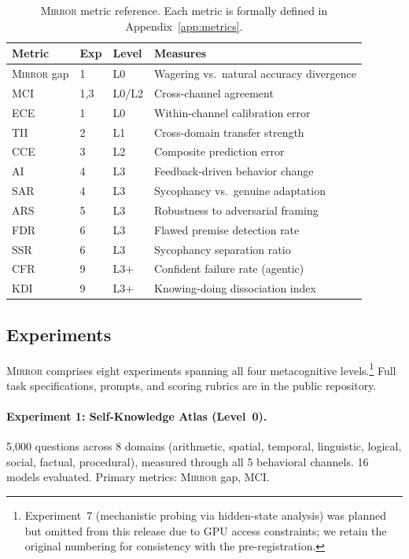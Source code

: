 \documentclass[10pt]{article}
\newcommand{\mirror}{\textsc{Mirror}}
\newcommand{\MCI}{MCI}
\newcommand{\CCE}{CCE}
\newcommand{\ARS}{ARS}
\newcommand{\KDI}{KDI}
\newcommand{\CFR}{CFR}
\newcommand{\SSR}{SSR}
\newcommand{\FDR}{FDR}
\newcommand{\TII}{TII}
\newcommand{\SAR}{SAR}
\newcommand{\AI}{AI}
\begin{document}
\begin{table}[h]
\centering
\caption{\mirror{} metric reference. Each metric is formally defined in Appendix~\ref{app:metrics}.}
\label{tab:metrics}
\small
\begin{tabular}{llll}
\toprule
Metric & Exp & Level & Measures \\
\midrule
\mirror{} gap & 1 & L0 & Wagering vs.\ natural accuracy divergence \\
\MCI{} & 1,3 & L0/L2 & Cross-channel agreement \\
ECE & 1 & L0 & Within-channel calibration error \\
\TII{} & 2 & L1 & Cross-domain transfer strength \\
\CCE{} & 3 & L2 & Composite prediction error \\
\AI{} & 4 & L3 & Feedback-driven behavior change \\
\SAR{} & 4 & L3 & Sycophancy vs.\ genuine adaptation \\
\ARS{} & 5 & L3 & Robustness to adversarial framing \\
\FDR{} & 6 & L3 & Flawed premise detection rate \\
\SSR{} & 6 & L3 & Sycophancy separation ratio \\
\CFR{} & 9 & L3+ & Confident failure rate (agentic) \\
\KDI{} & 9 & L3+ & Knowing-doing dissociation index \\
\bottomrule
\end{tabular}
\end{table}

\subsection{Experiments}

\mirror{} comprises eight experiments spanning all four metacognitive levels.\footnote{Experiment~7 (mechanistic probing via hidden-state analysis) was planned but omitted from this release due to GPU access constraints; we retain the original numbering for consistency with the pre-registration.} Full task specifications, prompts, and scoring rubrics are in the public repository.

\paragraph{Experiment 1: Self-Knowledge Atlas (Level~0).}
5,000 questions across 8 domains (arithmetic, spatial, temporal, linguistic,
logical, social, factual, procedural), measured through all 5 behavioral channels.
16 models evaluated. Primary metrics: \mirror{} gap, \MCI{}.
\end{document}
